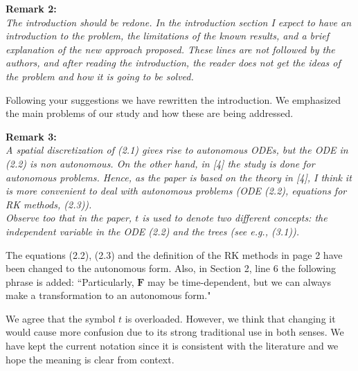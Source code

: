 \documentclass[12pt]{article}
\newcommand{\remark}[2]{\vspace{25pt} \noindent \textbf{Remark #1:\newline} \textit{#2}\vspace{15pt}}
\renewcommand{\newline}{\vspace{15pt}\\}
\newcommand{\david}[1]{\textcolor{red}{\\\textbf{D: \footnotesize #1}\\}}
\newcommand{\yiannis}[1]{\textcolor{OliveGreen}{\\\textbf{Y: \footnotesize #1}\\}}
\begin{document}
%

\remark{2}{
The introduction should be redone. 
In the introduction section I expect to have an introduction to the problem, the 
limitations of the known results, and a brief explanation of the new approach proposed. 
These lines are not followed by the authors, and after reading the introduction, the 
reader does not get the ideas of the problem and how it is going to be solved.}

Following your suggestions we have rewritten the introduction. 
We emphasized the main problems of our study and how these are being addressed.

\remark{3}{
A spatial discretization of (2.1) gives rise to autonomous ODEs, but the ODE in (2.2) is
non autonomous. 
On the other hand, in [4] the study is done for autonomous problems.
Hence, as the paper is based on the theory in [4], I think it is more convenient to deal
with autonomous problems (ODE (2.2), equations for RK methods, (2.3)).
\newline
Observe too that in the paper, $t$ is used to denote two different concepts: the independent
variable in the ODE (2.2) and the trees (see e.g., (3.1)).}

The equations (2.2), (2.3) and the definition of the RK methods in page 2 have been
changed to the autonomous form. 
Also, in Section 2, line 6 the following phrase is added:
``Particularly, $\bm{F}$ may be time-dependent, but we can always make a transformation 
to an autonomous form."

We agree that the symbol $t$ is overloaded.  However, we think that changing it would cause more
confusion due to its strong traditional use in both senses.  We have kept the current notation since
it is consistent with the literature and we hope the meaning is clear from context.

\pagebreak
\end{document}

